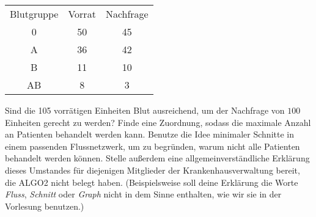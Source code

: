 \documentclass{uebung_cs}
\begin{document}
\begin{exercise}[Blutspende][\athome\mittel]
\begin{enumerate}
    	\vspace{4mm}
    	\begin{center}
    	\begin{tabular}{|c|c|c|}
    	Blutgruppe & Vorrat & Nachfrage \\ 
    	0 & 50 & 45 \\ 
    	A & 36 & 42 \\ 
    	B & 11 & 10 \\ 
    	AB & 8 & 3 \\ 
    	\end{tabular}
    	\end{center}
    	\vspace{4mm}
    	Sind die 105 vorrätigen Einheiten Blut ausreichend, um der Nachfrage von $100$ Einheiten gerecht zu werden? Finde eine Zuordnung, sodass die maximale Anzahl an Patienten behandelt werden kann. Benutze die Idee minimaler Schnitte in einem passenden Flussnetzwerk, um zu begründen, warum nicht alle Patienten behandelt werden können. Stelle außerdem eine allgemeinverständliche Erklärung dieses Umstandes für diejenigen Mitglieder der Krankenhausverwaltung bereit, die ALGO2 nicht belegt haben. (Beispielsweise soll deine Erklärung die Worte \emph{Fluss}, \emph{Schnitt} oder \emph{Graph} nicht in dem Sinne enthalten, wie wir sie in der Vorlesung benutzen.)
    \end{enumerate}
\end{exercise}
\end{document}

